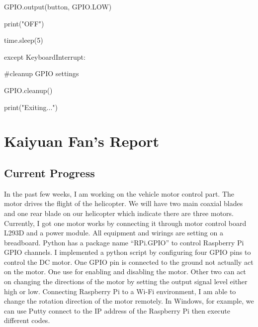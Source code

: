 \documentclass[onecolumn, draftclsnofoot,10pt, compsoc]{IEEEtran}
\begin{document}
				\begin{flushleft}
				\quad \quad GPIO.output(button, GPIO.LOW)
				\end{flushleft}
				\begin{flushleft}
				\quad \quad print("OFF")
				\end{flushleft}
				\begin{flushleft}
				\quad \quad time.sleep(5)
				\end{flushleft}
\begin{flushleft}
except KeyboardInterrupt:
\end{flushleft}
	\begin{flushleft}
		\begin{flushleft}
		\quad \#cleanup GPIO settings
		\end{flushleft}
		\begin{flushleft}
		\quad GPIO.cleanup()
		\end{flushleft}
		\begin{flushleft}
		\quad print("Exiting...")
	\end{flushleft}
\end{flushleft}


\section{Kaiyuan Fan's Report}


\subsection{Current Progress}


In the past few weeks, I am working on the vehicle motor control part. The motor drives the flight of the helicopter. We will have two main coaxial blades and one rear blade on our helicopter which indicate there are three motors. Currently, I got one motor works by connecting it through motor control board L293D and a power module. All equipment and wirings are setting on a breadboard. Python has a package name “RPi.GPIO” to control Raspberry Pi GPIO channels. I implemented a python script by configuring four GPIO pins to control the DC motor. One GPIO pin is connected to the ground not actually act on the motor. One use for enabling and disabling the motor. Other two can act on changing the directions of the motor by setting the output signal level either high or low. Connecting Raspberry Pi to a Wi-Fi environment, I am able to change the rotation direction of the motor remotely. In Windows, for example, we can use Putty connect to the IP address of the Raspberry Pi then execute different codes.
\end{document}
